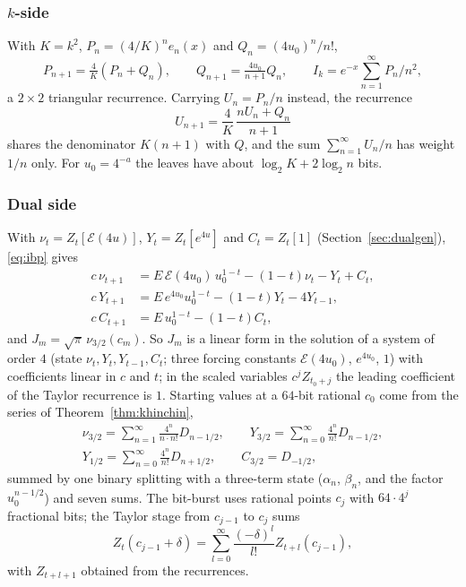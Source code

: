 \documentclass[11pt]{amsart}
\theoremstyle{definition}
\theoremstyle{remark}
\newcommand{\Eip}{\mathcal{E}}
\begin{document}
\subsubsection{$k$-side} With $K = k^2$, $P_n = (4/K)^ne_n(x)$ and $Q_n = (4u_0)^n/n!$,
\[
  P_{n+1} = \tfrac4K(P_n + Q_n), \qquad Q_{n+1} = \tfrac{4u_0}{n+1}Q_n, \qquad I_k = e^{-x}\sum_{n=1}^{\infty}P_n/n^2,
\]
a $2\times2$ triangular recurrence. Carrying $U_n = P_n/n$ instead, the recurrence
\[
  U_{n+1} = \frac{4}{K}\,\frac{nU_n + Q_n}{n+1}
\]
shares the denominator $K(n+1)$ with $Q$, and the sum $\sum_{n=1}^{\infty} U_n/n$ has weight $1/n$ only. For $u_0 = 4^{-a}$ the
leaves have about $\log_2 K + 2\log_2 n$ bits.

\subsubsection{Dual side} With $\nu_t = Z_t[\Eip(4u)]$, $Y_t = Z_t[e^{4u}]$ and $C_t = Z_t[1]$ (Section~\ref{sec:dualgen}),
\eqref{eq:ibp} gives
\begin{align*}
  c\,\nu_{t+1} &= E\,\Eip(4u_0)\,u_0^{1-t} - (1-t)\nu_t - Y_t + C_t, \\
  c\,Y_{t+1} &= E\,e^{4u_0}u_0^{1-t} - (1-t)Y_t - 4Y_{t-1}, \\
  c\,C_{t+1} &= E\,u_0^{1-t} - (1-t)C_t,
\end{align*}
and $J_m = \sqrt\pi\,\nu_{3/2}(c_m)$. So $J_m$ is a linear form in the solution of a system of order $4$
(state $\nu_t, Y_t, Y_{t-1}, C_t$; three forcing constants $\Eip(4u_0)$, $e^{4u_0}$, $1$) with coefficients
linear in $c$ and $t$; in the scaled variables $c^jZ_{t_0+j}$ the leading coefficient of the Taylor recurrence is $1$.
Starting values at a $64$-bit rational $c_0$ come from the series of Theorem~\ref{thm:khinchin},
\begin{gather*}
  \nu_{3/2} = \sum_{n=1}^{\infty}\frac{4^n}{n\cdot n!}D_{n-1/2}, \qquad Y_{3/2} = \sum_{n=0}^{\infty}\frac{4^n}{n!}D_{n-1/2}, \\
  Y_{1/2} = \sum_{n=0}^{\infty}\frac{4^n}{n!}D_{n+1/2}, \qquad C_{3/2} = D_{-1/2},
\end{gather*}
summed by one binary splitting with a three-term state ($\alpha_n$, $\beta_n$, and the factor $u_0^{n-1/2}$) and
seven sums. The bit-burst uses rational points $c_j$ with $64\cdot4^j$ fractional bits; the Taylor stage from
$c_{j-1}$ to $c_j$ sums
\[
  Z_t(c_{j-1}+\delta) = \sum_{l=0}^{\infty}\frac{(-\delta)^l}{l!}Z_{t+l}(c_{j-1}),
\]
with $Z_{t+l+1}$ obtained from the recurrences.
\end{document}
